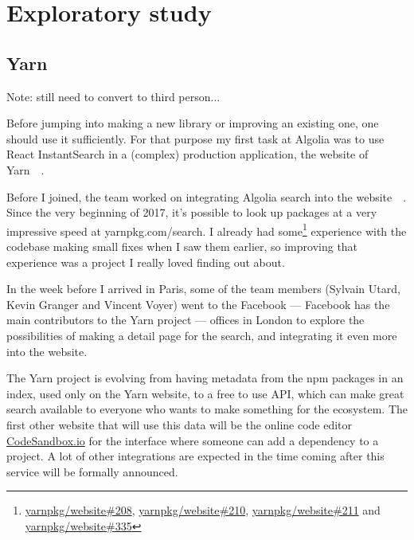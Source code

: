 
\chapter{Exploratory study} %
\label{chp:exploratory_study}
\section{Yarn} %
\label{sec:yarn}

Note: still need to convert to third person...

Before jumping into making a new library or improving an existing one, one should use it sufficiently. For that purpose my first task at Algolia was to use React InstantSearch in a (complex) production application, the website of Yarn~\cite{yarn-site}~.


Before I joined, the team worked on integrating Algolia search into the website~\cite{yarn-pr-add-algolia}~. Since the very beginning of 2017, it's possible to look up packages at a very impressive speed at yarnpkg.com/search. I already had some\footnote{\href{https://github.com/yarnpkg/website/pulls/208}{yarnpkg/website\#208}, \href{https://github.com/yarnpkg/website/pulls/210}{yarnpkg/website\#210}, \href{https://github.com/yarnpkg/website/pulls211}{yarnpkg/website\#211} and \href{https://github.com/yarnpkg/website/pulls/335}{yarnpkg/website\#335}} experience with the codebase making small fixes when I saw them earlier, so improving that experience was a project I really loved finding out about.


In the week before I arrived in Paris, some of the team members (Sylvain Utard, Kevin Granger and Vincent Voyer) went to the Facebook --- Facebook has the main contributors to the Yarn project --- offices in London to explore the possibilities of making a detail page for the search, and integrating it even more into the website.

The Yarn project is evolving from having metadata from the npm packages in an index, used only on the Yarn website, to a free to use API, which can make great search available to everyone who wants to make something for the ecosystem. The first other website that will use this data will be the online code editor \href{https://codesandbox.io}{CodeSandbox.io} for the interface where someone can add a dependency to a project. A lot of other integrations are expected in the time coming after this service will be formally announced.

